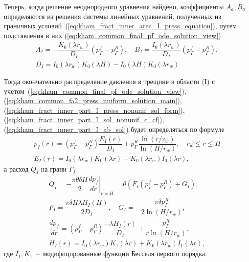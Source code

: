 \documentclass{article}
\begin{document}
Теперь, когда решение неоднородного уравнения найдено, коэффициенты $A_a, B_a$ определяются из решения системы
линейных уравнений, полученных из граничных условий~(\ref{eq:kham_fract_inner_area_I_press_equation}), путем подставления
в них (\ref{eq:kham_common_final_pf_ode_solution_view})
\begin{equation}
	\displaystyle
	\begin{gathered}
		A_I = - \dfrac{K_0 \left(\lambda r_w\right)}{D_I} \left(p^f_{\Gamma} - p^R_{\Gamma}\right), \quad
		B_I = \dfrac{I_0 \left(\lambda r_w\right)}{D_I} \left(p^f_{\Gamma} - p^R_{\Gamma}\right), \\[6pt]
		D_I = I_0 \left(\lambda r_w \right)K_0\left(\lambda H\right) - I_0\left(\lambda H\right) K_0\left(\lambda r_w\right)
	\end{gathered}
	\label{eq:kham_fract_inner_part_I_ab_sol}
\end{equation}

Тогда окончательно распределение давления в трещине в области (I) с учетом~(\ref{eq:kham_common_final_pf_ode_solution_view}),
(\ref{eq:kham_common_fa2_press_uniform_solution_main}), (\ref{eq:kham_fract_inner_part_I_press_nonunif_sol_form}), 
(\ref{eq:kham_fract_inner_part_I_sol_nonunif_c_cf}),
(\ref{eq:kham_fract_inner_part_I_ab_sol}) будет определяться по формуле
\begin{equation}
	\displaystyle
	\begin{gathered}
		p_f\left(r\right) = \left(p^f_{\Gamma} - p^R_{\Gamma}\right)
		\dfrac{E_I\left(r\right)}{D_I}
		+ p^R_{\Gamma} \dfrac{\ln\left(r/r_w\right)}{\ln{\left(H/r_w\right)}}, \quad
		r_w \leq r \leq H \\[6pt]
		E_I\left(r\right) = I_0\left(\lambda r_w\right)K_0\left(\lambda r\right) - K_0\left(\lambda r_w\right)I_0\left(\lambda r\right),
	\end{gathered}
	\label{eq:kham_final_sol_pf_radial}
\end{equation}
а расход $Q_I$ на грани $\Gamma_f$
\begin{equation}
	\displaystyle
	\begin{gathered}
		Q_I = - \dfrac{\pi \theta \delta H}{2} \left. \dfrac{d p_f}{d r}\right|_{r=H} =
		\theta \left(    F_I \left(p^f_{\Gamma} - p^R_{\Gamma}\right) + G_I \right) , \\[8pt]
		F_I = \dfrac{\pi \delta H \lambda H_I\left(H\right)}{2 D_I}, \quad
		G_I = -\dfrac{\pi \delta p^R_{\Gamma}}{2 \ln{\left(H/r_w\right)}},  \\[8pt]
		\dfrac{d p_f}{d r} = \left(p^f_{\Gamma} - p^R_{\Gamma}\right)
		\dfrac{-\lambda H_I\left(r\right)}{D_I} +
		\dfrac{p^R_{\Gamma}}{r \ln{\left(H/r_w\right)}}, \\[8pt]
		H_I\left(r\right) =
		I_0\left(\lambda r_w\right)K_1\left(\lambda r\right) +
		K_0\left(\lambda r_w\right)I_1\left(\lambda r\right),
	\end{gathered}
	\label{eq:kham_q_Gf}
\end{equation}
где $I_1, K_1$~--~модифицированные функции Бесселя первого порядка.
\end{document}
